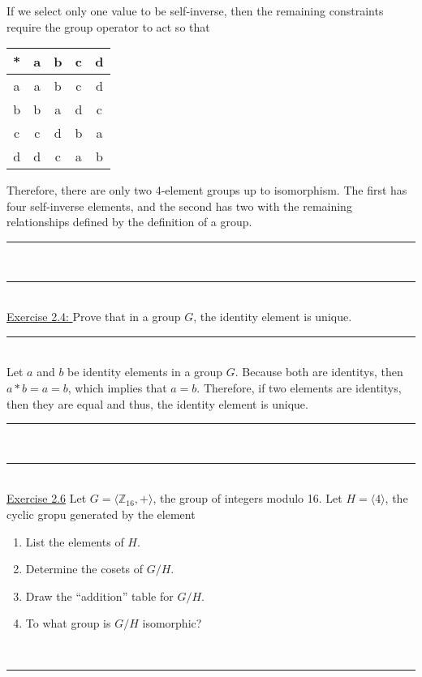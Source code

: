\documentclass{article}
\newcommand{\problemsep}{\leavevmode\\[0.05in] \rule[\baselineskip/4]{\textwidth}{1pt} \\[0.005in] \rule[\baselineskip]{\textwidth}{1pt}\vspace{-\baselineskip}\leavevmode\\[0.05in]}
\newcommand{\statementsep}{\leavevmode\\[0.005in] \rule[\baselineskip/4]{\textwidth}{0.4pt}\leavevmode\\[0.005in]}
\begin{document}
If we select only one value to be self-inverse, then the remaining constraints require the group operator to act so that \begin{center}
	\begin{tabular}{c | c c c c}
	* & a & b & c & d \\ \hline
  a & a & b & c & d \\ 
  b & b & a & d & c \\
  c & c & d & b & a \\
  d & d & c & a & b \\
\end{tabular}
\end{center} 
Therefore, there are only two 4-element groups up to isomorphism. The first has four self-inverse elements, and the second has two with the remaining relationships defined by the definition of a group.
\problemsep
\noindent\underline{Exercise 2.4: } 
Prove that in a group $G$, the identity element is unique.
\statementsep
Let $a$ and $b$ be identity elements in a group $G$. Because both are identitys, then $a*b = a = b$, which implies that $a = b$. Therefore, if two elements are identitys, then they are equal and thus, the identity element is unique.
\problemsep
\noindent\underline{Exercise 2.6}
Let $G = \langle \mathbb{Z}_{16},+ \rangle$, the group of integers modulo 16. Let $H = \langle 4\rangle$, the cyclic gropu generated by the element %
\begin{enumerate}
	\item List the elements of $H$.
	\item Determine the cosets of $G/H$.
	\item Draw the ``addition'' table for $G/H$.
	\item To what group is $G/H$ isomorphic?
\end{enumerate}
\statementsep
\end{document}
